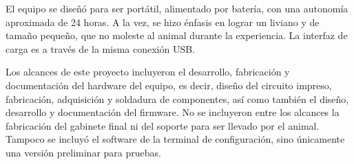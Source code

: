 El equipo se diseñó para ser portátil, alimentado por batería, con una autonomía aproximada de 24 horas. A la vez, se hizo énfasis en lograr un liviano y de tamaño pequeño, que no moleste al animal durante la experiencia. La interfaz de carga es a través de la misma conexión USB.

Los alcances de este proyecto incluyeron el desarrollo, fabricación y documentación del hardware del equipo, es decir, diseño del circuito impreso, fabricación, adquisición y soldadura de componentes, así como también el diseño, desarrollo y documentación del firmware. No se incluyeron entre los alcances la fabricación del gabinete final ni del soporte para ser llevado por el animal. Tampoco se incluyó el software de la terminal de configuración, sino únicamente una versión preliminar para pruebas.

